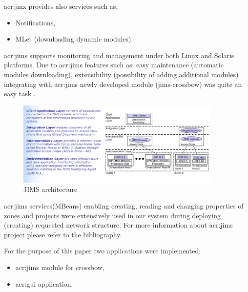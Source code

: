 \documentclass[11pt]{book}
\begin{document}
      \gls{acr:jmx} provides also services such as:

      \begin{itemize}
        \item Notifications,
        \item MLet (downloading dynamic modules).
      \end{itemize}
	
      \gls{acr:jims} supports monitoring and management under both Linux and Solaris
      platforms.  Due to \gls{acr:jims} features such as: easy maintenance (automatic modules downloading), extensibility
      (possibility of adding additional modules) integrating with \gls{acr:jims} newly developed module (jims-crossbow) was quite
      an easy task \cite{jims}.
    
      \begin{figure}[H]
        \begin{center}
          \includegraphics[width=0.9\textwidth]{img/jims/jims.png}
        \end{center}
        \caption{JIMS architecture \cite{jims}}
      \end{figure}
	 
      \gls{acr:jims} services(MBeans) enabling creating, reading and changing properties of zones and projects were extensively
      used in our system during deploying (creating) requested network structure. For more information about \gls{acr:jims}
      project please refer to the bibliography.	
    
      \medskip
	
      For the purpose of this paper two applications were implemented:
	
      \begin{itemize}
        \item \gls{acr:jims} module for crossbow,
        \item \gls{acr:gui} application.
      \end{itemize}
	  
	  \medskip
	
\end{document}
